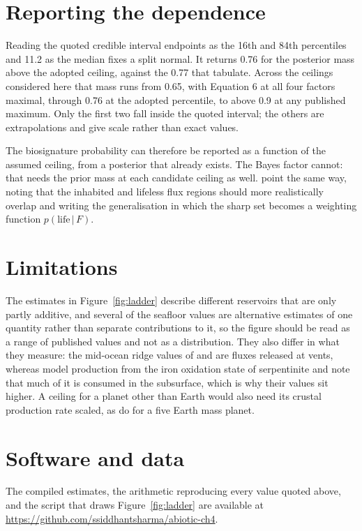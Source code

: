 \documentclass{aastex701}
\begin{document}
\section{Reporting the dependence} \label{sec:reportable}

Reading the quoted credible interval endpoints as the 16th and 84th percentiles and
11.2 as the median fixes a split normal. It returns 0.76 for the posterior mass above
the adopted ceiling, against the 0.77 that \citet{wogan2026} tabulate. Across the
ceilings considered here that mass runs from 0.65, with Equation 6 at all four
factors maximal, through 0.76 at the adopted percentile, to above 0.9 at any
published maximum. Only the first two fall inside the quoted interval; the others are
extrapolations and give scale rather than exact values.

The biosignature probability can therefore be reported as a function of the assumed
ceiling, from a posterior that already exists. The Bayes factor cannot: that needs
the prior mass at each candidate ceiling as well. \citet{wogan2026} point the same
way, noting that the inhabited and lifeless flux regions should more realistically
overlap and writing the generalisation in which the sharp set becomes a weighting
function $p(\mathrm{life}\,|\,F)$.

\section{Limitations} \label{sec:limits}

The estimates in Figure~\ref{fig:ladder} describe different reservoirs that are only
partly additive, and several of the seafloor values are alternative estimates of one
quantity rather than separate contributions to it, so the figure should be read as a
range of published values and not as a distribution. They also differ in what they
measure: the mid-ocean ridge values of \citet{keir2010} and \citet{cannat2010} are
fluxes released at vents, whereas \citet{merdith2020} model production from the iron
oxidation state of serpentinite and note that much of it is consumed in the
subsurface, which is why their values sit higher. A ceiling for a planet other than
Earth would also need its crustal production rate scaled, as \citet{guzman2013} do
for a five Earth mass planet.

\section{Software and data} \label{sec:data}

The compiled estimates, the arithmetic reproducing every value quoted above, and the
script that draws Figure~\ref{fig:ladder} are available at
\url{https://github.com/ssiddhantsharma/abiotic-ch4}.



\end{document}

